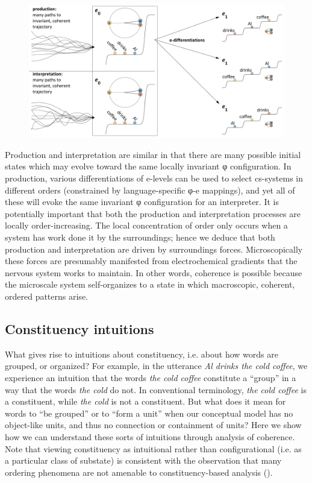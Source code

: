   
\begin{figure}
\includegraphics[width=\textwidth]{figures/Tilsen-img135.png}
\caption{\missingcaption}
\label{fig:}
\end{figure}
 

  Production and interpretation are similar in that there are many possible initial states which may evolve toward the same locally invariant φ configuration. In production, various differentiations of e-levels can be used to select cs-systems in different orders (constrained by language-specific φ-e mappings), and yet all of these will evoke the same invariant φ configuration for an interpreter. It is potentially important that both the production and interpretation processes are locally order-increasing. The local concentration of order only occurs when a system has work done it by the surroundings; hence we deduce that both production and interpretation are driven by surroundings forces. Microscopically these forces are presumably manifested from electrochemical gradients that the nervous system works to maintain. In other words, coherence is possible because the microscale system self-organizes to a state in which macroscopic, coherent, ordered patterns arise.

\subsection{Constituency intuitions}

What gives rise to intuitions about constituency, i.e. about how words are grouped, or organized? For example, in the utterance \textit{Al drinks the cold coffee}, we experience an intuition that the words \textit{the cold coffee} constitute a “group” in a way that the words \textit{the cold} do not. In conventional terminology, \textit{the cold coffee} is a constituent, while \textit{the cold} is not a constituent. But what does it mean for words to “be grouped” or to “form a unit” when our conceptual model has no object-like units, and thus no connection or containment of units? Here we show how we can understand these sorts of intuitions through analysis of coherence. Note that viewing constituency as intuitional rather than configurational (i.e. as a particular class of substate) is consistent with the observation that many ordering phenomena are not amenable to constituency-based analysis (\citealt{Langacker1997,Phillips2003}).

